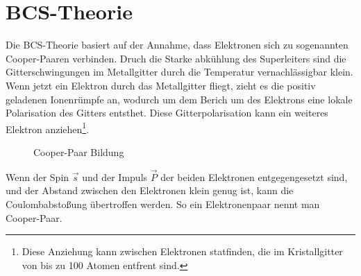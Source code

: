 \section{BCS-Theorie}
Die BCS-Theorie basiert auf der Annahme, dass Elektronen sich zu sogenannten Cooper-Paaren verbinden. 
Druch die Starke abkühlung des Superleiters sind die Gitterschwingungen im Metallgitter durch die Temperatur 
vernachlässigbar klein. Wenn jetzt ein Elektron durch das Metallgitter fliegt, zieht es die positiv geladenen
Ionenrümpfe an, wodurch um dem Berich um des Elektrons eine lokale Polarisation des Gitters entsthet. Diese 
Gitterpolarisation kann ein weiteres Elektron anziehen\footnote{Diese Anziehung kann zwischen Elektronen statfinden, die im Kristallgitter von bis zu 100 Atomen entfrent sind.}. 

\begin{figure}[!ht]
    \centering
    \caption{Cooper-Paar Bildung}
    \label{fig:CooperPaar}
\end{figure}
Wenn der Spin $\overrightarrow{s}$ und der Impuls $\overrightarrow{P}$ der beiden Elektronen entgegengesetzt sind, und der 
Abstand zwischen den Elektronen klein genug ist, kann die Coulombabstoßung übertroffen werden. So ein Elektronenpaar nennt man
Cooper-Paar. 

